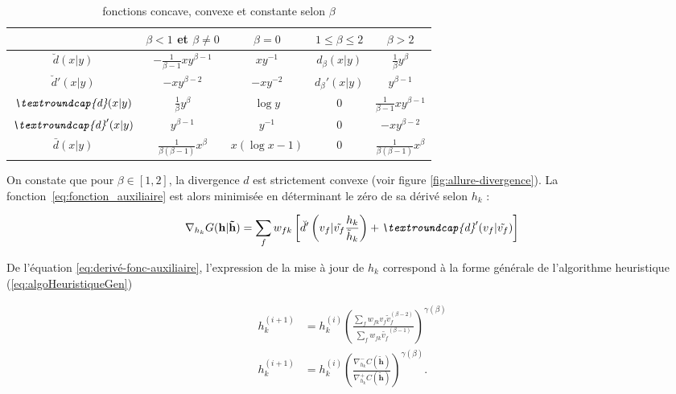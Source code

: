 \begin{table}[t] 
\centering
	\begin{tabular}{|*{5}{c|}}
 		\hline			
   		 & $\beta < 1$ et $\beta \neq 0$  & $\beta = 0$ & $1 \leq \beta \leq 2$ & $\beta > 2$  \\
   		\hline
   		$\breve{d}(x\vert y)$&$-\frac{1}{\beta -1}xy^{\beta-1}$ & $xy^{-1}$ & $d_{\beta}(x\vert y)$& $\frac{1}{\beta}y^{\beta}$ \\
   		\hline
   		$\breve{d}'(x\vert y)$& $-xy^{\beta-2}$ & $-xy^{-2}$ & $d_{\beta}'(x\vert y)$ & $y^{\beta-1}$\\
   		\hline
   		$\textit{\textroundcap{d}}(x\vert y)$& $\frac{1}{\beta}y^{\beta}$ & $\log y$ & 0 & $\frac{1}{\beta-1}xy^{\beta-1}$ \\
   		\hline
   		$\textit{\textroundcap{d}}'(x\vert y)$& $y^{\beta-1}$ & $y^{-1}$ & 0 & $-xy^{\beta-2}$ \\
   		\hline
   		$\bar{d}(x\vert y)$& $\frac{1}{\beta(\beta-1)}x^{\beta}$ & $x(\log x-1)$ & 0 & $\frac{1}{\beta(\beta-1)}x^{\beta}$\\
   		\hline
 	\end{tabular}
\caption{fonctions concave, convexe et constante selon $\beta$}
\label{tab:fonctionConcaveConvexe}
\end{table} 

On constate que pour $\beta \in \left[1,2 \right]$, la divergence $d$ est strictement convexe (voir figure \ref{fig:allure-divergence}). La fonction~\ref{eq:fonction_auxiliaire} est alors minimisée en déterminant le zéro de sa dérivé selon $h_k$ :
 
\begin{equation}\label{eq:derivé-fonc-auxiliaire}
\nabla_{h_k} G(\mathbf{h}\vert \mathbf{\tilde{h}}) = \sum_f w_{fk}\left[\breve{d}'\left(v_f\vert \tilde{v_f}\frac{h_k}{\tilde{h}_k}\right) + \textit{\textroundcap{d}}'(v_f\vert \tilde{v_f})\right]
\end{equation}

De l'équation \ref{eq:derivé-fonc-auxiliaire}, l'expression de la mise à jour de $h_k$ correspond à la forme générale de l'algorithme heuristique (\ref{eq:algoHeuristiqueGen})

\begin{align}\label{eq:update_hk}
h_k^{(i+1)} & = h_k^{(i)}\left(\frac{\sum_f w_{fk} v_f \tilde{v}_f^{(\beta-2)}}{\sum_f w_{fk} \tilde{v_f}^{(\beta-1)}}\right)^{\gamma(\beta)}\\
h_k^{(i+1)} & = h_k^{(i)}\left(\frac{\nabla_{h_{k}}^- C(\mathbf{\tilde{h}})}{\nabla_{h_{k}}^+ C(\mathbf{\tilde{h}})}\right)^{\gamma(\beta)}.
\end{align}

